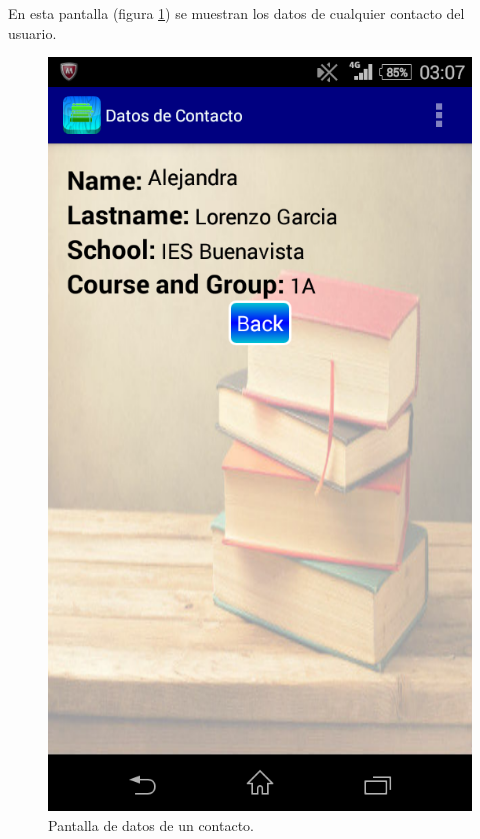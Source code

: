 		En esta pantalla (figura \ref{fig:data}) se muestran los datos de cualquier contacto del usuario.
		
		\begin{figure}[h !]
			\centering
			\includegraphics[scale=0.2]{Imagenes/App/dataContact}
			\caption{Pantalla de datos de un contacto.}
			\label{fig:data}
		\end{figure}